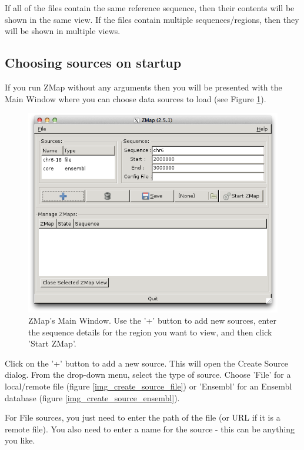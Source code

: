 \documentclass[letterpaper]{article}
\newcounter{Figure}
\begin{document}
If all of the files contain the same reference sequence, then their contents will be shown in the same view. If the files contain multiple sequences/regions, then they will be shown in multiple views.

\subsection{Choosing sources on startup}
If you run ZMap without any arguments then you will be presented with the Main Window where you can choose data sources to load (see Figure \ref{img_main_window}).

\begin{figure}
\centering
\color[rgb]{0.30980393,0.5058824,0.7411765}
\includegraphics[resolution=150]{img_main_window.png}
\caption{ZMap's Main Window. Use the '+' button to add new sources, enter the sequence details for the region you want to view, and then click 'Start ZMap'.}
\label{img_main_window}
\end{figure}

Click on the '+' button to add a new source. This will open the Create Source dialog. From the drop-down menu, select the type of source. Choose 'File' for a local/remote file (figure \ref{img_create_source_file}) or 'Ensembl' for an Ensembl database (figure \ref{img_create_source_ensembl}).

For File sources, you just need to enter the path of the file (or URL if it is a remote file). You also need to enter a name for the source - this can be anything you like.
\end{document}
